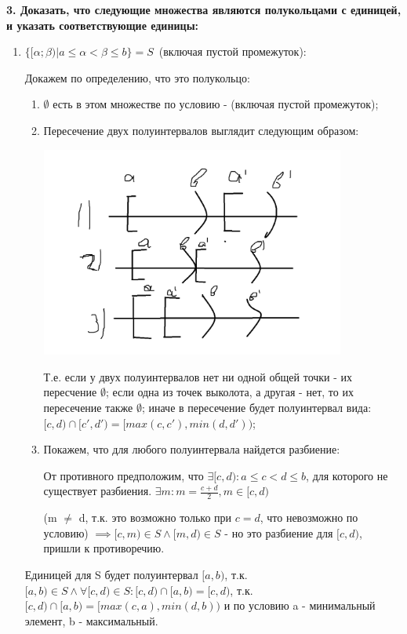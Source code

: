 \documentclass{article}
\begin{document}
\noindent \textbf{3. Доказать, что следующие множества являются полукольцами с единицей, и указать соответствующие единицы:}

\begin{enumerate}

\item $\{[\alpha;\beta)|a\le\alpha< \beta \le b\} = S$ (включая пустой промежуток): 

Докажем по определению, что это полукольцо:

\begin{enumerate}
\item $\emptyset$ есть в этом множестве по условию - (включая пустой промежуток);

\item Пересечение двух полуинтервалов выглядит следующим образом: 

\includegraphics[width=100mm]{Semirings}

Т.е. если у двух полуинтервалов нет ни одной общей точки - их пересчение $\emptyset$; если одна из точек выколота, а другая - нет, то их пересечение также $\emptyset$; иначе в пересечение будет полуинтервал вида: $[c,d) \cap [c',d') = [max(c,c'), min(d,d'))$;

\item Покажем, что для любого полуинтервала найдется разбиение:

От противного предположим, что $\exists [c,d):  a\le c < d \le b$, для которого не существует разбиения. $\exists m: m = \frac{c+d}{2}, m \in [c,d)$

(m $\neq$ d, т.к. это возможно только при $c=d$, что невозможно по условию) $\implies [c,m) \in S \land [m,d) \in S$ - но это разбиение для $[c,d)$, пришли к противоречию.
\end{enumerate}

Единицей для S будет полуинтервал $[a,b)$, т.к. $[a,b) \in S \land \forall [c,d) \in S: [c,d) \cap [a,b) = [c,d)$, т.к. $[c,d) \cap [a,b) = [max(c,a), min(d,b))$ и по условию a - минимальный элемент, b - максимальный.


\end{enumerate}
\end{document}
